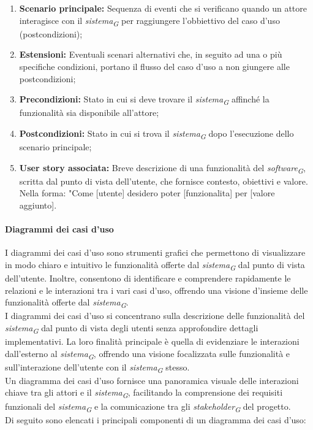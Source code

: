 \begin{enumerate}
    \item \textbf{Scenario principale:} Sequenza di eventi che si verificano quando un attore interagisce con il \textit{sistema}\textsubscript{\textit{G}} per raggiungere l'obbiettivo del caso d'uso (postcondizioni);
    \item \textbf{Estensioni:} Eventuali scenari alternativi che, in seguito ad una o più specifiche condizioni, portano il flusso del caso d'uso a non giungere alle postcondizioni;
    \item \textbf{Precondizioni:} Stato in cui si deve trovare il \textit{sistema}\textsubscript{\textit{G}} affinché la funzionalità sia disponibile all'attore;
    \item \textbf{Postcondizioni:} Stato in cui si trova il \textit{sistema}\textsubscript{\textit{G}} dopo l'esecuzione dello scenario principale;
    \item \textbf{User story associata:} Breve descrizione di una funzionalità del \textit{software}\textsubscript{\textit{G}}, scritta dal punto di vista dell'utente, che fornisce contesto, obiettivi e valore. \\
    Nella forma: "Come [utente] desidero poter [funzionalita] per [valore aggiunto].
\end{enumerate}

\paragraph{Diagrammi dei casi d'uso} 
I diagrammi dei casi d'uso sono strumenti grafici che permettono di visualizzare in modo chiaro e intuitivo le funzionalità offerte dal \textit{sistema}\textsubscript{\textit{G}} dal punto di vista dell'utente. Inoltre, consentono di identificare e comprendere rapidamente le relazioni e le interazioni tra i vari casi d'uso, offrendo una visione d'insieme delle funzionalità offerte dal \textit{sistema}\textsubscript{\textit{G}}.\\
I diagrammi dei casi d'uso si concentrano sulla descrizione delle funzionalità del \textit{sistema}\textsubscript{\textit{G}} dal punto di vista degli utenti senza approfondire dettagli implementativi. La loro finalità principale è quella di evidenziare le interazioni dall'esterno al \textit{sistema}\textsubscript{\textit{G}}, offrendo una visione focalizzata sulle funzionalità e sull'interazione dell'utente con il \textit{sistema}\textsubscript{\textit{G}} stesso. \\
Un diagramma dei casi d'uso fornisce una panoramica visuale delle interazioni chiave tra gli attori e il \textit{sistema}\textsubscript{\textit{G}}, facilitando la comprensione dei requisiti funzionali del \textit{sistema}\textsubscript{\textit{G}} e la comunicazione tra gli \textit{stakeholder}\textsubscript{\textit{G}} del progetto. \\
Di seguito sono elencati i principali componenti di un diagramma dei casi d'uso:

